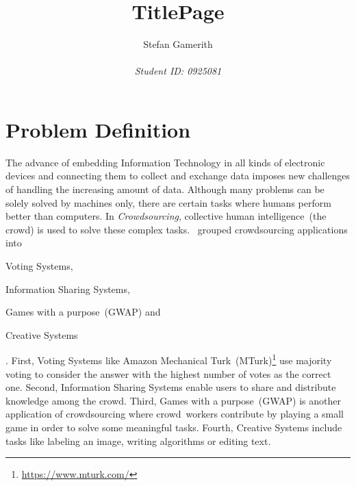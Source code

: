 \documentclass[12pt, notitlepage]{article}
\title{TitlePage}
\author{Stefan Gamerith\\\\
		\emph{Student ID: 0925081}}
\begin{document}
	\maketitle
	\thispagestyle{empty}
	\newpage
\setcounter{page}{1}

\section{Problem Definition}
The advance of embedding Information Technology in all kinds of electronic devices and connecting them to collect and exchange data imposes new challenges of handling the increasing amount of data. Although many problems can be solely solved by machines only, there are certain tasks where humans perform better than computers. In \emph{Crowdsourcing}, collective human intelligence~(the crowd) is used to solve these complex tasks. \citet{yuen2011survey}~grouped crowdsourcing applications into 
\begin{inparaenum}[1)]
		\item Voting Systems,
		\item Information Sharing Systems,
		\item Games with a purpose~(GWAP) and
		\item Creative Systems
\end{inparaenum}. 
First, Voting Systems like Amazon Mechanical Turk~(MTurk)\footnote{\url{https://www.mturk.com/}} use majority voting to consider the answer with the highest number of votes as the correct one. Second, Information Sharing Systems enable users to share and distribute knowledge among the crowd. Third, Games with a purpose~(GWAP) is another application of crowdsourcing where crowd~workers contribute by playing a small game in order to solve some meaningful tasks. Fourth, Creative Systems include tasks like labeling an image, writing algorithms or editing text. 
\end{document}
